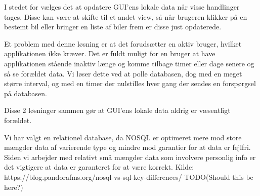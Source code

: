 \documentclass[a4paper,12pt,fleqn,oneside]{article}
\begin{document}
I stedet for vælges det at opdatere GUI'ens lokale data når visse handlinger tages. Disse kan være at skifte til et andet view, så når brugeren klikker på en bestemt bil eller bringer en liste af biler frem er disse just opdaterede.\newline

Et problem med denne løsning er at det forudsætter en aktiv bruger, hvilket applikationen ikke kræver. Det er fuldt muligt for en bruger at have applikationen stående inaktiv længe og komme tilbage timer eller dage senere og så se forældet data. Vi løser dette ved at polle databasen, dog med en meget større interval, og med en timer der nulstilles hver gang der sendes en forspørgsel på databasen.\newline

Disse 2 løsninger sammen gør at GUI'ens lokale data aldrig er væsentligt forældet.

Vi har valgt en relationel database, da NOSQL er optimeret mere mod store mængder data af varierende type og mindre mod garantier for at data er fejlfri. Siden vi arbejder med relativt små mængder data som involvere personlig info er det vigtigere at data er garanteret for at være korrekt.
Kilde: https://blog.pandorafms.org/nosql-vs-sql-key-differences/
TODO(Should this be here?)





\printbibliography
\end{document}
